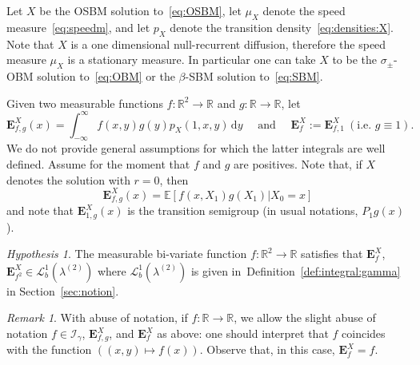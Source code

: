 \documentclass[12pt]{article}
\numberwithin{equation}{section}
\theoremstyle{definition}
\theoremstyle{remark}
\newtheorem{hypothesis}{Hypothesis}
\newtheorem{remark}{Remark}
\newcommand{\RR}{\mathbb{R}}
\newcommand{\EE}{\mathbb{E}}
\newcommand{\vd}{\,\mathrm{d}}
\newcommand{\Lgb}[1]{\mathcal{L}^{1}_{b}(\lambda^{(#1)})}
\newcommand{\Lg}[1]{\mathcal{I}_{#1}}
\newcommand{\bfF}[1]{\mathbf{E}^X_{#1}}
\begin{document}


Let $X$ be the OSBM solution to~\eqref{eq:OSBM}, let $\mu_X$ denote the speed measure~\eqref{eq:speedm}, and let $p_X$ denote the transition density~\eqref{eq:densities:X}.
Note that 
$X$ is a one dimensional null-recurrent diffusion, therefore the speed measure $\mu_X$ is a stationary measure.
In particular one can take $X$ to be the $\sigma_\pm$-OBM solution to~\eqref{eq:OBM} or the $\beta$-SBM solution to~\eqref{eq:SBM}.


Given two measurable functions $f\colon \RR^2 \to \RR$ and $g\colon \RR \to \RR$, let
\begin{equation} \label{eq:muX}
	\bfF{f,g}(x) = \int_{-\infty}^{\infty} f(x,y) g(y) p_X(1,x,y) \vd y \quad
\text{ and } \quad \bfF{f} := \bfF{f,1}
\ (\text{i.e.~}g\equiv 1).
\end{equation}
We do not provide general assumptions for which the latter integrals are well defined. Assume for the moment that $f$ and $g$ are positives.
Note that, if $X$ denotes the solution with $r=0$, then
\begin{equation}
	\bfF{f,g}(x)=\EE\!\left[f(x,X_1) g(X_1) | X_0=x\right]
\end{equation}
and note that $\bfF{1,g}(x)$ is the transition semigroup (in usual notations, $P_1 g(x)$).


\begin{hypothesis} \label{hp:OSBM:1}
The measurable bi-variate 
function $f \colon \RR^2 \to \RR$ satisfies that
$\bfF{f}$, %
$\bfF{f^2} \in \Lgb{2}$
where $\Lgb{2}$ is given in~Definition~\ref{def:integral:gamma} in Section~\ref{sec:notion}.
\end{hypothesis}


\begin{remark} \label{rem:f_one_in_I}
With abuse of notation, if $f\colon \mathbb R \to \mathbb R$, we allow the slight abuse of notation 
$f \in \Lg{\gamma}$, $\bfF{f,g}$, and $\bfF{f}$ as above: one should interpret that $f$ coincides with the function 
$\left( (x,y) \mapsto f(x)\right)$.
Observe that, in this case, $\bfF{f}=f$.
\end{remark}
\end{document}
